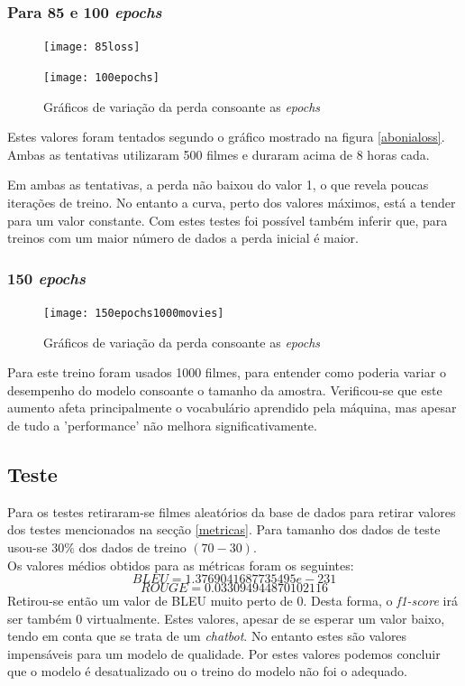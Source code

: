 \documentclass{article}
\begin{document}
\subsubsection{Para 85 e 100 \textit{epochs}}
\begin{figure}[htb]
    \centering
    \texttt{[image: 85loss]}
    \caption{}
    \label{85loss}
\end{figure}
\begin{figure}[htb]
    \centering
    \texttt{[image: 100epochs]}
    \caption{Gráficos de variação da perda consoante as \textit{epochs}}
    \label{100loss}
\end{figure}
Estes valores foram tentados segundo o gráfico mostrado na figura \ref{abonialoss}. Ambas as tentativas utilizaram 500 filmes e duraram acima de 8 horas cada.

Em ambas as tentativas, a perda não baixou do valor 1, o que revela poucas iterações de treino. No entanto a curva, perto dos valores máximos, está a tender para um valor constante. Com estes testes foi possível também inferir que, para treinos com um maior número de dados a perda inicial é maior.

\subsubsection{150 \textit{epochs}}
\begin{figure}[h]
    \centering
    \texttt{[image: 150epochs1000movies]}
    \caption{Gráficos de variação da perda consoante as \textit{epochs}}
    \label{150epochs}
\end{figure}

Para este treino foram usados 1000 filmes, para entender como poderia variar o desempenho do modelo consoante o tamanho da amostra. Verificou-se que este aumento afeta principalmente o vocabulário aprendido pela máquina, mas apesar de tudo a 'performance' não melhora significativamente.

\subsection{Teste}

Para os testes retiraram-se filmes aleatórios da base de dados para retirar valores dos testes mencionados na secção \ref{metricas}. Para tamanho dos dados de teste usou-se $30\%$ dos dados de treino $(70-30)$.\\

Os valores médios obtidos para as métricas foram os seguintes:
$$ BLEU = 1.3769041687735495e-231$$
$$ ROUGE = 0.033094944870102116$$
Retirou-se então um valor de BLEU muito perto de 0. Desta forma, o \textit{f1-score} irá ser também 0 virtualmente. Estes valores, apesar de se esperar um valor baixo, tendo em conta que se trata de um \textit{chatbot}. No entanto estes são valores impensáveis para um modelo de qualidade. Por estes valores podemos concluir que o modelo é desatualizado ou o treino do modelo não foi o adequado.
\end{document}
